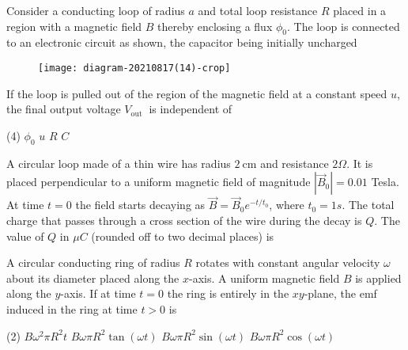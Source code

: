 \begin{enumerate}
	\begin{minipage}{\textwidth}
		\item Consider a conducting loop of radius $a$ and total loop resistance $R$ placed in a region with a magnetic field $B$ thereby enclosing a flux $\phi_{0}$. The loop is connected to an electronic circuit as shown, the capacitor being initially uncharged\\
		\begin{figure}[H]
			\centering
			\texttt{[image: diagram-20210817(14)-crop]}
		\end{figure}
		If the loop is pulled out of the region of the magnetic field at a constant speed $u$, the final output voltage $V_{\text {out }}$ is independent of
	\end{minipage}
	\begin{tasks}(4)
		\task[\textbf{A.}] $\phi_{0}$
		\task[\textbf{B.}]$u$ 
		\task[\textbf{C.}]$R$
		\task[\textbf{D.}] $C$ 
	\end{tasks}
\begin{minipage}{\textwidth}
	\item A circular loop made of a thin wire has radius $2 \mathrm{~cm}$ and resistance $2 \Omega$. It is placed perpendicular to a uniform magnetic field of magnitude $\left|\vec{B}_{0}\right|=0.01$ Tesla. At time $t=0$ the field starts decaying as $\vec{B}=\vec{B}_{0} e^{-t / t_{0}}$, where $t_{0}=1 s .$ The total charge that passes through a cross section of the wire during the decay is $Q$. The value of $Q$ in $\mu C$ (rounded off to two decimal places) is
\end{minipage}
\begin{minipage}{\textwidth}
	\item A circular conducting ring of radius $R$ rotates with constant angular velocity $\omega$ about its diameter placed along the $x$-axis. A uniform magnetic field $B$ is applied along the $y$-axis. If at time $t=0$ the ring is entirely in the $x y$-plane, the emf induced in the ring at time $t>0$ is
\end{minipage}
\begin{tasks}(2)
	\task[\textbf{A.}] $B \omega^{2} \pi R^{2} t$
	\task[\textbf{B.}]$B \omega \pi R^{2} \tan (\omega t)$
	\task[\textbf{C.}]$B \omega \pi R^{2} \sin (\omega t)$
	\task[\textbf{D.}]$B \omega \pi R^{2} \cos (\omega t)$
\end{tasks}
\begin{minipage}{\textwidth}

\end{minipage}
\end{enumerate}
